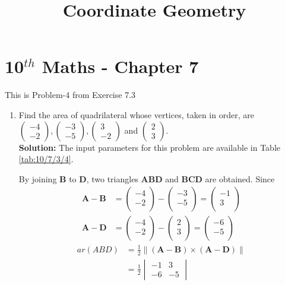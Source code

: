 \documentclass[12pt]{article}
\newcommand{\mydet}[1]{\ensuremath{\begin{vmatrix}#1\end{vmatrix}}}
\providecommand{\brak}[1]{\ensuremath{\left(#1\right)}}
\providecommand{\norm}[1]{\left\lVert#1\right\rVert}
\newcommand{\solution}{\noindent \textbf{Solution: }}
\newcommand{\myvec}[1]{\ensuremath{\begin{pmatrix}#1\end{pmatrix}}}
\let\vec\mathbf
\begin{document}
\begin{center}
\title{\textbf{Coordinate Geometry}}
\date{\vspace{-5ex}} %
\maketitle
\end{center}
\setcounter{page}{1}
\section*{10$^{th}$ Maths - Chapter 7}
This is Problem-4 from Exercise 7.3
\begin{enumerate}
\item Find the area of quadrilateral whose vertices, taken in order, are $\myvec{-4 \\ -2}, \myvec{-3\\-5}, \myvec{3\\-2}$ and $\myvec{2\\3}$.\\
	\solution 
\fi
		The input parameters for this problem are available in Table \eqref{tab:10/7/3/4}.
\begin{table}[ht!]\centering

\caption{}
\label{tab:10/7/3/4}	
\end{table}
By joining $\vec{B}$ to $\vec{D}$, two triangles $\vec{A}\vec{B}\vec{D}$ and $\vec{B}\vec{C}\vec{D}$ are obtained.
Since
\begin{align}
	\vec{A}- \vec{B} &= \myvec{-4\\-2\\}-\myvec{-3\\-5\\}=\myvec{-1\\3\\}\label{eq:chapters/10/7/3/4/2}\\
	  \vec{A}- \vec{D} &= \myvec{-4\\-2\\}-\myvec{2\\3\\}=\myvec{-6\\-5\\}\label{eq:chapters/10/7/3/4/3}
  \end{align}
  \begin{align}
	  ar(ABD)&=\frac{1}{2} \norm{\brak{\vec{A}-\vec{B}}  \times 
   \brak{\vec{A}- \vec{D}}} \label{eq:chapters/10/7/3/4/1} 
   \\
	  &=	\frac{1}{2}\mydet{-1 & 3\\-6 & -5}  

\end{align}
\end{enumerate}
\end{document}
